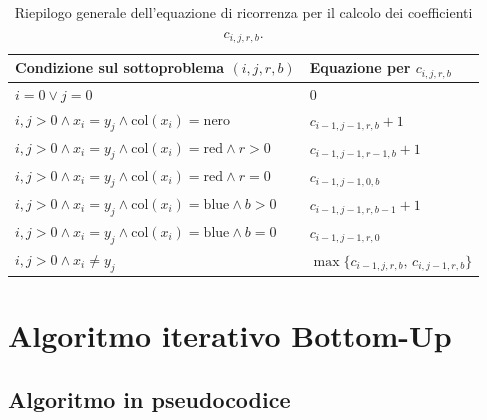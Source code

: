 \vspace{0.3cm}
\begin{table}[H]
\centering
\small
\begin{tabular}{ll}
\toprule
\textbf{Condizione sul sottoproblema $(i, j, r, b)$} & \textbf{Equazione per $c_{i,j,r,b}$} \\
\midrule
$i = 0 \lor j = 0$ & $0$ \\
$i,j > 0 \land x_i = y_j \land \text{col}(x_i) = \text{nero}$ & $c_{i-1,j-1,r,b} + 1$ \\
$i,j > 0 \land x_i = y_j \land \text{col}(x_i) = \text{red} \land r > 0$ & $c_{i-1,j-1,r-1,b} + 1$ \\
$i,j > 0 \land x_i = y_j \land \text{col}(x_i) = \text{red} \land r = 0$ & $c_{i-1,j-1,0,b}$ \\
$i,j > 0 \land x_i = y_j \land \text{col}(x_i) = \text{blue} \land b > 0$ & $c_{i-1,j-1,r,b-1} + 1$ \\
$i,j > 0 \land x_i = y_j \land \text{col}(x_i) = \text{blue} \land b = 0$ & $c_{i-1,j-1,r,0}$ \\
$i,j > 0 \land x_i \neq y_j$ & $\max\{c_{i-1,j,r,b},\, c_{i,j-1,r,b}\}$ \\
\bottomrule
\end{tabular}
\caption{Riepilogo generale dell'equazione di ricorrenza per il calcolo dei coefficienti $c_{i,j,r,b}$.}
\end{table}

\newpage
\section{Algoritmo iterativo Bottom-Up}
\subsection{Algoritmo in pseudocodice}

